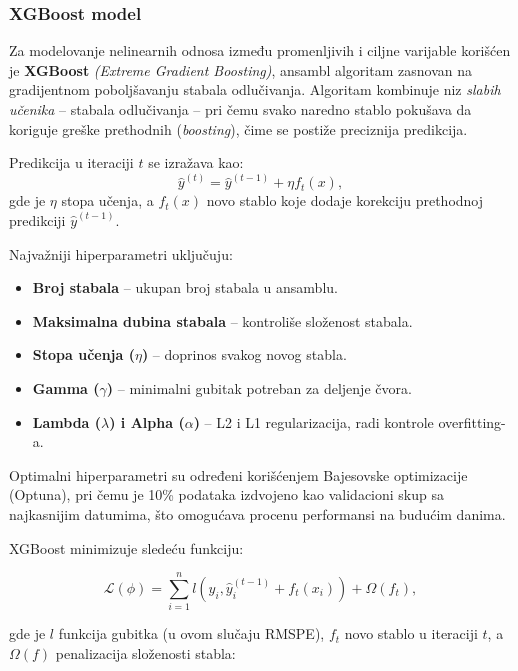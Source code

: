 \documentclass[12pt]{article}
\begin{document}
\subsubsection*{XGBoost model} \label{subsubsec:xgboost}

Za modelovanje nelinearnih odnosa između promenljivih i ciljne varijable korišćen je \textbf{XGBoost} \textit{(Extreme Gradient Boosting)}, ansambl algoritam zasnovan na gradijentnom poboljšavanju stabala odlučivanja.  
Algoritam kombinuje niz \textit{slabih učenika} – stabala odlučivanja – pri čemu svako naredno stablo pokušava da koriguje greške prethodnih (\textit{boosting}), čime se postiže preciznija predikcija.  

Predikcija u iteraciji \(t\) se izražava kao:
\begin{equation}
    \hat{y}^{(t)} = \hat{y}^{(t-1)} + \eta f_t(x),
\end{equation}
gde je \(\eta\) stopa učenja, a \(f_t(x)\) novo stablo koje dodaje korekciju prethodnoj predikciji \(\hat{y}^{(t-1)}\).

Najvažniji hiperparametri uključuju:
\begin{itemize}
    \item \textbf{Broj stabala} – ukupan broj stabala u ansamblu.
    \item \textbf{Maksimalna dubina stabala} – kontroliše složenost stabala.
    \item \textbf{Stopa učenja (\(\eta\))} – doprinos svakog novog stabla.
    \item \textbf{Gamma (\(\gamma\))} – minimalni gubitak potreban za deljenje čvora.
    \item \textbf{Lambda (\(\lambda\)) i Alpha (\(\alpha\))} – L2 i L1 regularizacija, radi kontrole overfitting-a.
\end{itemize}

Optimalni hiperparametri su određeni korišćenjem Bajesovske optimizacije (Optuna), pri čemu je 10\% podataka izdvojeno kao validacioni skup sa najkasnijim datumima, što omogućava procenu performansi na budućim danima.

XGBoost minimizuje sledeću funkciju:

\begin{equation}
    \mathcal{L}(\phi) = \sum_{i=1}^{n} l\left(y_i, \hat{y}_i^{(t-1)} + f_t(x_i)\right) + \Omega(f_t),
\end{equation}

gde je \(l\) funkcija gubitka (u ovom slučaju RMSPE), \(f_t\) novo stablo u iteraciji \(t\), a \(\Omega(f)\) penalizacija složenosti stabla:
\end{document}
